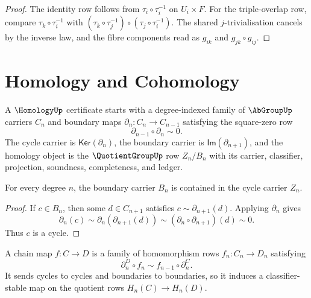 \begin{proof}
The identity row follows from $\tau_i\circ\tau_i^{-1}$ on
$U_i\times F$.  For the triple-overlap row, compare
$\tau_k\circ\tau_i^{-1}$ with
$(\tau_k\circ\tau_j^{-1})\circ(\tau_j\circ\tau_i^{-1})$.  The shared
$j$-trivialisation cancels by the inverse law, and the fibre components read
as $g_{ik}$ and $g_{jk}\circ g_{ij}$.
\end{proof}

\section{Homology and Cohomology}
\label{sec:geometry-spine-homology}

\begin{definition}
\label{def:geometry-spine-homology}
A $\HomologyUp$ certificate starts with a degree-indexed family of
$\AbGroupUp$ carriers $C_n$ and boundary maps
$\partial_n:C_n\to C_{n-1}$ satisfying the square-zero row
$$
\partial_{n-1}\circ\partial_n\sim 0.
$$
The cycle carrier is $\mathsf{Ker}(\partial_n)$, the boundary carrier is
$\mathsf{Im}(\partial_{n+1})$, and the homology object is the
$\QuotientGroupUp$ row $Z_n/B_n$ with its carrier, classifier, projection,
soundness, completeness, and ledger.
\end{definition}

\begin{theorem}
\label{thm:geometry-spine-boundaries-cycles}
For every degree $n$, the boundary carrier $B_n$ is contained in the cycle
carrier $Z_n$.
\end{theorem}

\begin{proof}
If $c\in B_n$, then some $d\in C_{n+1}$ satisfies
$c\sim\partial_{n+1}(d)$.  Applying $\partial_n$ gives
$$
\partial_n(c)
\sim
\partial_n(\partial_{n+1}(d))
\sim
(\partial_n\circ\partial_{n+1})(d)
\sim
0.
$$
Thus $c$ is a cycle.
\end{proof}

\begin{definition}
\label{def:geometry-spine-chain-map}
A chain map $f:C\to D$ is a family of homomorphism rows
$f_n:C_n\to D_n$ satisfying
$$
\partial^D_n\circ f_n\sim f_{n-1}\circ\partial^C_n.
$$
It sends cycles to cycles and boundaries to boundaries, so it induces a
classifier-stable map on the quotient rows $H_n(C)\to H_n(D)$.
\end{definition}

